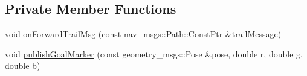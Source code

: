 \subsection*{Private Member Functions}
\begin{DoxyCompactItemize}
\item 
void \hyperlink{classcl__move__base__z_1_1undo__path__global__planner_1_1UndoPathGlobalPlanner_ae5e3c5922ceb8783a6a01d904fc9c230}{on\+Forward\+Trail\+Msg} (const nav\+\_\+msgs\+::\+Path\+::\+Const\+Ptr \&trail\+Message)
\item 
void \hyperlink{classcl__move__base__z_1_1undo__path__global__planner_1_1UndoPathGlobalPlanner_a37a85e1cd57173902d8302cb8cb9b933}{publish\+Goal\+Marker} (const geometry\+\_\+msgs\+::\+Pose \&pose, double r, double g, double b)
\end{DoxyCompactItemize}
